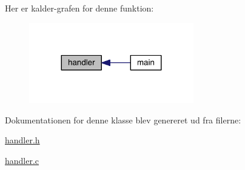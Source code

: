 Her er kalder-\/grafen for denne funktion\+:\nopagebreak
\begin{figure}[H]
\begin{center}
\leavevmode
\includegraphics[width=203pt]{d2/d01/class_handler_af5be5b016b862943cd22504490acc8f4_icgraph}
\end{center}
\end{figure}




Dokumentationen for denne klasse blev genereret ud fra filerne\+:\begin{DoxyCompactItemize}
\item 
\hyperlink{handler_8h}{handler.\+h}\item 
\hyperlink{handler_8c}{handler.\+c}\end{DoxyCompactItemize}
